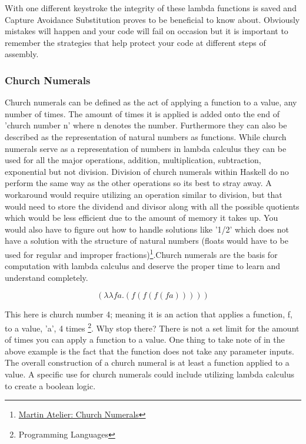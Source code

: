 \documentclass{article}
\begin{document}
        \noindent With one different keystroke the integrity of these lambda functions is saved and Capture Avoidance Substitution proves to be beneficial to know about. Obviously mistakes will happen and your code will fail on occasion but it is important to remember the strategies that help protect your code at different steps of assembly.
        
    
        \subsubsection{Church Numerals}
        Church numerals can be defined as the act of applying a function to a value, any number of times. The amount of times it is applied is added onto the end of 'church number n' where n denotes the number. Furthermore they can also be described as the representation of natural numbers as functions. While church numerals serve as a representation of numbers in lambda calculus they can be used for all the major operations, addition, multiplication, subtraction, exponential but not division. Division of church numerals within Haskell do no perform the same way as the other operations so its best to stray away. A workaround would require utilizing an operation similar to division, but that would need to store the dividend and divisor along with all the  possible quotients which would be less efficient due to the amount of memory it takes up. You would also have to figure out how to handle solutions like '1/2' which does not have a solution with the structure of natural numbers (floats would have to be used for regular and improper fractions)\footnote{\href{https://mjoldfield.com/atelier/2011/01/church-numerals.html}{Martin Atelier: Church Numerals}}.Church numerals are the basis for computation with lambda calculus and deserve the proper time to learn and understand completely. 
        
        \medskip
             $$(\lambda λ f a . (f (f (f (f a)))))$$
        \medskip
    
    \noindent This here is church number 4; meaning it is an action that applies a function, f, to a value, 'a', 4 times \footnote{Programming Languages}. Why stop there? There is not a set limit for the amount of times you can apply a function to a value. One thing to take note of in the above example is the fact that the function does not take any parameter inputs. The overall construction of a church numeral is at least a function applied to a value. A specific use for church numerals could include utilizing lambda calculus to create a boolean logic.
    
\end{document}
